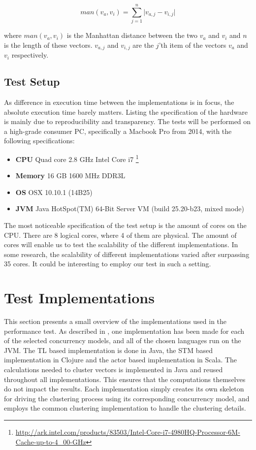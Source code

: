 {\begin{equation}\label{eq:mandistance}
man(v_a,v_i)=\sum_{j=1}^{n}\lvert v_{a,j}-v_{i,j}\rvert
\end{equation}

where $man(v_a,v_i)$ is the Manhattan distance between the two $v_a$ and $v_i$ and $n$ is the length of these vectors. $v_{a,j}$ and $v_{i,j}$ are the $j$'th item of the vectors $v_a$ and $v_i$ respectively.

\subsection{Test Setup}\label{subsec:hardware}
As difference in execution time between the implementations is in focus, the absolute execution time barely matters. Listing the specification of the hardware is mainly due to reproducibility and transparency.
The tests will be performed on a high-grade consumer PC, specifically a Macbook Pro from 2014, with the following specifications:
\begin{itemize}
	\item \textbf{CPU} Quad core 2.8 GHz Intel Core i7 \footnote{\url{http://ark.intel.com/products/83503/Intel-Core-i7-4980HQ-Processor-6M-Cache-up-to-4_00-GHz}}
	\item \textbf{Memory} 16 GB 1600 MHz DDR3L
	\item \textbf{\ac{OS}} OSX 10.10.1 (14B25)
	\item \textbf{\ac{JVM}} Java HotSpot(TM) 64-Bit Server VM (build 25.20-b23, mixed mode)
\end{itemize}

The most noticeable specification of the test setup is the amount of cores on the \ac{CPU}. There are 8 logical cores, where 4 of them are physical. The amount of cores will enable us to test the scalability of the different implementations. In some research\cite{harris2003language}, the scalability of different implementations varied after surpassing 35 cores. It could be interesting to employ our test in such a setting.

\section{Test Implementations}
This section presents a small overview of the implementations used in the performance test. As described in , one implementation has been made for each of the selected concurrency models, and all of the chosen languages run on the \ac{JVM}. The \ac{TL} based implementation is done in Java, the \ac{STM} based implementation in Clojure and the actor based implementation in Scala. The calculations needed to cluster vectors is implemented in Java and reused throughout all implementations. This ensures that the computations themselves do not impact the results. Each implementation simply creates its own skeleton for driving the clustering process using its corresponding concurrency model, and employs the common clustering implementation to handle the clustering details. 

}
